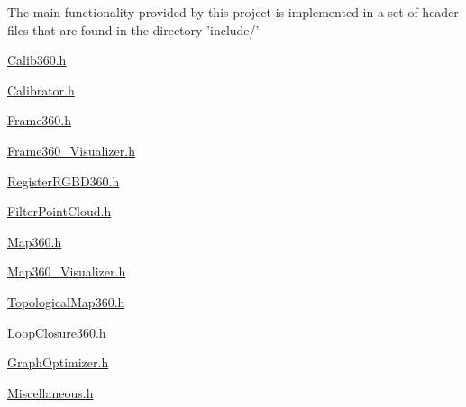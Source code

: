 The main functionality provided by this project is implemented in a set of header files that are found in the directory 'include/'
\begin{DoxyItemize}
\item \hyperlink{Calib360_8h_source}{Calib360.\-h}
\item \hyperlink{Calibrator_8h_source}{Calibrator.\-h}
\item \hyperlink{Frame360_8h_source}{Frame360.\-h}
\item \hyperlink{Frame360__Visualizer_8h_source}{Frame360\-\_\-\-Visualizer.\-h}
\item \hyperlink{RegisterRGBD360_8h_source}{Register\-R\-G\-B\-D360.\-h}
\item \hyperlink{FilterPointCloud_8h_source}{Filter\-Point\-Cloud.\-h}
\item \hyperlink{Map360_8h_source}{Map360.\-h}
\item \hyperlink{Map360__Visualizer_8h_source}{Map360\-\_\-\-Visualizer.\-h}
\item \hyperlink{TopologicalMap360_8h_source}{Topological\-Map360.\-h}
\item \hyperlink{LoopClosure360_8h_source}{Loop\-Closure360.\-h}
\item \hyperlink{GraphOptimizer_8h_source}{Graph\-Optimizer.\-h}
\item \hyperlink{Miscellaneous_8h_source}{Miscellaneous.\-h}
\end{DoxyItemize}

